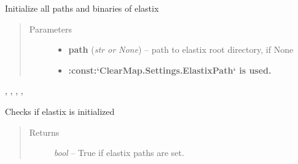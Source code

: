\documentclass[letterpaper,10pt,english]{sphinxmanual}
\begin{document}
\begin{fulllineitems}
\label{api/ClearMap.Alignment:ClearMap.Alignment.Elastix.initializeElastix}
Initialize all paths and binaries of elastix
\begin{quote}\begin{description}
\item[{Parameters}] \leavevmode\begin{itemize}
\item {} 
\textbf{path} (\emph{str or None}) --
path to elastix root directory, if None

\item {} 
\textbf{:const:{}`ClearMap.Settings.ElastixPath{}` is used.}

\end{itemize}

\end{description}\end{quote}




{\hyperref[api/ClearMap.Alignment:ClearMap.Alignment.Elastix.ElastixBinary]{\emph{}}}, {\hyperref[api/ClearMap.Alignment:ClearMap.Alignment.Elastix.ElastixLib]{\emph{}}}, {\hyperref[api/ClearMap.Alignment:ClearMap.Alignment.Elastix.TransformixBinary]{\emph{}}},
{\hyperref[api/ClearMap.Alignment:ClearMap.Alignment.Elastix.Initialized]{\emph{}}}, {\hyperref[api/ClearMap.Alignment:ClearMap.Alignment.Elastix.setElastixLibraryPath]{\emph{}}}



\end{fulllineitems}


\begin{fulllineitems}
\label{api/ClearMap.Alignment:ClearMap.Alignment.Elastix.checkElastixInitialized}
Checks if elastix is initialized
\begin{quote}\begin{description}
\item[{Returns}] \leavevmode
\emph{bool} --
True if elastix paths are set.

\end{description}\end{quote}

\end{fulllineitems}
\end{document}
